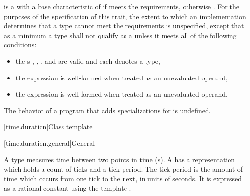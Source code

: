 \pnum
{} is a 
with a base characteristic of 
if  meets the  requirements,
otherwise .
For the purposes of the specification of this trait,
the extent to which an implementation determines
that a type cannot meet the  requirements is unspecified,
except that as a minimum
a type  shall not qualify as a 
unless it meets all of the following conditions:
\begin{itemize}
\item the s
,
,
, and
are valid and each denotes a type,
\item the expression
is well-formed when treated as an unevaluated operand,
\item the expression
is well-formed when treated as an unevaluated operand.
\end{itemize}

\pnum
The behavior of a program that adds specializations for  is undefined.

[time.duration]{Class template }

[time.duration.general]{General}

\pnum
A  type measures time between two points in time (s).
A  has a representation which holds a count of ticks and a tick period.
The tick period is the amount of time which occurs from one tick to the next, in units
of seconds. It is expressed as a rational constant using the template .

